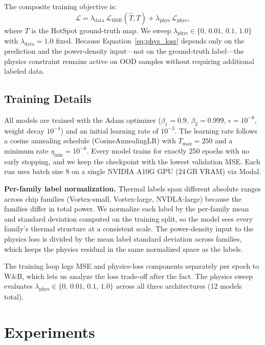 \documentclass[10pt,twocolumn,letterpaper]{article}
\begin{document}
The composite training objective is:
\begin{equation}
  \mathcal{L} =
  \lambda_\text{data}\,\mathcal{L}_\text{MSE}(\hat{T}, T)
  +
  \lambda_\text{phys}\,\mathcal{L}_\text{phys},
  \label{eq:total_loss}
\end{equation}
where $T$ is the HotSpot ground-truth map. We sweep
$\lambda_\text{phys} \in \{0,\,0.01,\,0.1,\,1.0\}$ with
$\lambda_\text{data} = 1.0$ fixed. Because Equation~\ref{eq:phys_loss}
depends only on the prediction and the power-density input---not on
the ground-truth label---the physics constraint remains active on
OOD samples without requiring additional labeled data.

\subsection{Training Details}

All models are trained with the Adam optimizer
($\beta_1 {=} 0.9$, $\beta_2 {=} 0.999$, $\epsilon {=} 10^{-8}$,
weight decay $10^{-4}$) and an initial learning rate of $10^{-3}$.
The learning rate follows a cosine annealing schedule (CosineAnnealingLR)
with $T_\text{max} = 250$ and a minimum rate $\eta_\text{min} = 10^{-6}$.
Every model trains for exactly 250 epochs with no early stopping, and we
keep the checkpoint with the lowest validation MSE. Each run uses batch
size 8 on a single NVIDIA A10G GPU (24\,GB VRAM) via Modal.

\textbf{Per-family label normalization.} Thermal labels span different
absolute ranges across chip families (Vortex-small, Vortex-large,
NVDLA-large) because the families differ in total power. We normalize
each label by the per-family mean and standard deviation computed on
the training split, so the model sees every family's thermal structure
at a consistent scale. The power-density input to the physics loss is
divided by the mean label standard deviation across families, which
keeps the physics residual in the same normalized space as the labels.

The training loop logs MSE and physics-loss components separately per
epoch to W\&B, which lets us analyze the loss trade-off after the fact.
The physics sweep evaluates $\lambda_\text{phys} \in \{0,\,0.01,\,0.1,\,1.0\}$
across all three architectures (12 models total).

\section{Experiments}
\end{document}
